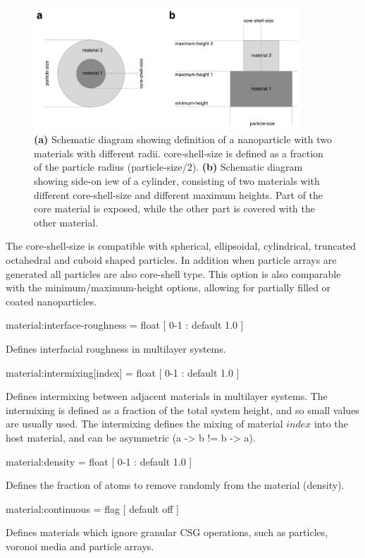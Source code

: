 \begin{figure}[!htb]
\center
\includegraphics[width=10cm]{figures/core-shell.pdf}
\caption{\textbf{(a)} Schematic diagram showing definition of a nanoparticle with two materials with different radii. core-shell-size is defined as a fraction of the particle radius (particle-size/2). \textbf{(b)} Schematic diagram showing side-on iew of a cylinder, consisting of two materials with different core-shell-size and different maximum heights. Part of the core material is exposed, while the other part is covered with the other material.}
\label{fig:core-shell}
\end{figure}

The core-shell-size is compatible with spherical, ellipsoidal, cylindrical, truncated octahedral and cuboid shaped particles. In addition when particle arrays are generated all particles are also core-shell type. This option is also comparable with the minimum/maximum-height options, allowing for partially filled or coated nanoparticles.

{\zicf material:interface-roughness = float [ 0-1 : default 1.0 ]} Defines interfacial roughness in multilayer systems.

{\zicf material:intermixing[index] = float [ 0-1 : default 1.0 ]} Defines intermixing between adjacent materials in multilayer systems. The intermixing is defined as a fraction of the total system height, and so small values are usually used. The intermixing defines the mixing of material $index$ into the host material, and can be asymmetric (a -> b != b -> a).

{\zicf material:density = float [ 0-1 : default 1.0 ]} Defines the fraction of atoms to remove randomly from the material (density).

{\zicf material:continuous = flag [ default off ]} Defines materials which ignore granular CSG operations, such as particles, voronoi media and particle arrays.

